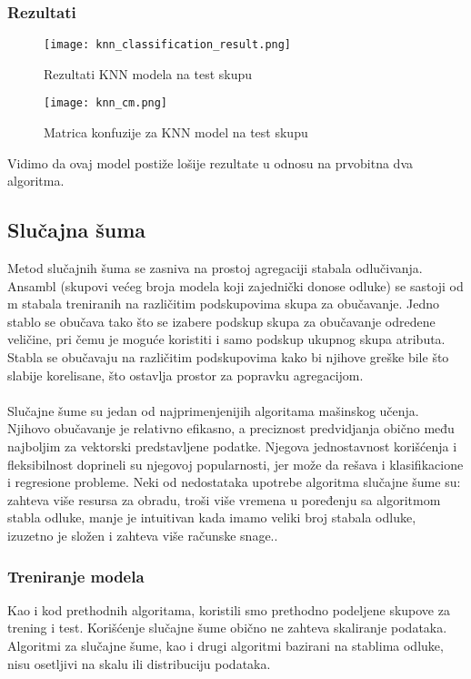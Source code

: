 \documentclass[a4paper,12pt]{article}
\begin{document}
\subsubsection{Rezultati}

\begin{figure}[H]
\centering
\texttt{[image: knn\_classification\_result.png]}
\caption{Rezultati KNN modela na test skupu}
\label{fig:knn_classification_result}
\end{figure}

\begin{figure}[H]
\centering
\texttt{[image: knn\_cm.png]}
\caption{Matrica konfuzije za KNN model na test skupu}
\label{fig:knn_cm}
\end{figure}

Vidimo da ovaj model postiže lošije rezultate u odnosu na prvobitna dva algoritma.

\subsection{Slučajna šuma}
Metod slučajnih šuma se zasniva na prostoj agregaciji stabala odlučivanja. Ansambl (skupovi većeg broja modela koji zajednički donose odluke) se sastoji od m stabala treniranih na različitim podskupovima skupa za obučavanje. Jedno stablo se obučava tako što se izabere podskup skupa za obučavanje odredene veličine, pri čemu je moguće koristiti i samo podskup ukupnog skupa atributa. Stabla se obučavaju na različitim podskupovima kako bi njihove greške bile što slabije korelisane, što ostavlja prostor za popravku agregacijom.
\\\\Slučajne šume su jedan od najprimenjenijih algoritama mašinskog učenja.
Njihovo obučavanje je relativno efikasno, a preciznost predvidjanja obično među
najboljim za vektorski predstavljene podatke. Njegova jednostavnost korišćenja i fleksibilnost doprineli su njegovoj popularnosti, jer može da rešava i klasifikacione i regresione probleme. Neki od nedostataka upotrebe algoritma slučajne šume su: zahteva više resursa za obradu, troši više vremena u poređenju sa algoritmom stabla odluke, manje je intuitivan kada imamo veliki broj stabala odluke, izuzetno je složen i zahteva više računske snage..

\subsubsection{Treniranje modela}
Kao i kod prethodnih algoritama, koristili smo prethodno podeljene skupove za trening i test. Korišćenje slučajne šume obično ne zahteva skaliranje podataka. Algoritmi za slučajne šume, kao i drugi algoritmi bazirani na stablima odluke, nisu osetljivi na skalu ili distribuciju podataka.
\end{document}
